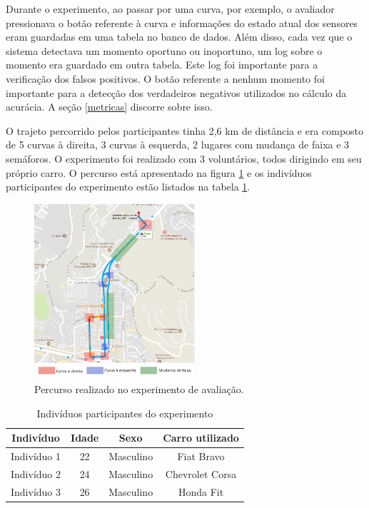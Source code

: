 Durante o experimento, ao passar por uma curva, por exemplo, o avaliador pressionava o botão
referente à curva e informações do estado atual dos sensores eram guardadas em uma tabela no banco de dados.
Além disso, cada vez que o sistema detectava um momento oportuno ou inoportuno, um log sobre o
momento era guardado em outra tabela. Este log foi importante para a verificação dos falsos positivos.
O botão referente a nenhum momento foi importante para a detecção dos verdadeiros negativos utilizados
no cálculo da acurácia. A seção \ref{metricas} discorre sobre isso.

O trajeto percorrido pelos participantes tinha 2,6 km de distância e era composto de 5 curvas à direita,
3 curvas à esquerda, 2 lugares com mudança de faixa e 3 semáforos. O experimento foi realizado com 3
voluntários, todos dirigindo em seu próprio carro. O percurso está apresentado na figura \ref{percurso} e os
indivíduos participantes do experimento estão listados na tabela \ref{participantes}.

\begin{figure}[H]
\centering
\includegraphics[width=0.53\textwidth]{images/percurso.png}
\caption{Percurso realizado no experimento de avaliação.}
\label{percurso}
\end{figure}

\begin{table}[h]
\centering
\caption{Indivíduos participantes do experimento}
\label{participantes}
\begin{tabular}{|c|c|c|c|}
\hline
\textbf{Indivíduo} & \textbf{Idade} & \textbf{Sexo} & \textbf{Carro utilizado} \\ \hline
Indivíduo 1        & 22             & Masculino     & Fiat Bravo               \\ \hline
Indivíduo 2        & 24             & Masculino     & Chevrolet Corsa          \\ \hline
Indivíduo 3        & 26             & Masculino     & Honda Fit                \\ \hline
\end{tabular}
\end{table}


